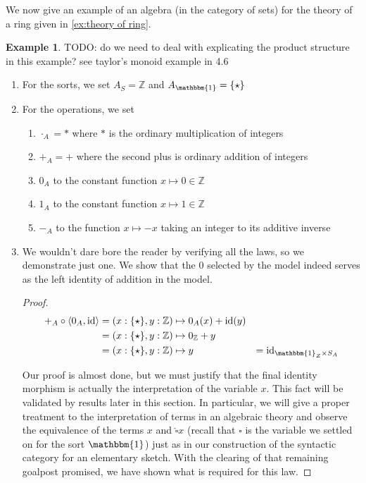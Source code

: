 \documentclass[12pt,twoside]{reedthesis}
\theoremstyle{definition}
\newtheorem{example}{Example}
\theoremstyle{remark}
\theoremstyle{plain}
\begin{document}
We now give an example of an algebra (in the category of sets) for the theory of
a ring given in \ref{ex:theory of ring}.
\begin{example}\label{ex:integer ring}
  TODO: do we need to deal with explicating the product structure in this
  example? see taylor's monoid example in 4.6
  \begin{enumerate}
    \item For the sorts, we set $A_{S} = \mathbb{Z}$ and $A_{\mathbbm{1}} = \{\star\}$
    \item For the operations, we set
    \begin{enumerate}
      \item $\cdot_A = *$ where $*$ is the ordinary multiplication of integers
      \item $+_{A} = +$ where the second plus is ordinary addition of integers
      \item $0_{A}$ to the constant function $x \mapsto 0 \in \mathbb{Z}$
      \item $1_{A}$ to the constant function $x \mapsto 1 \in \mathbb{Z}$
      \item $-_{A}$ to the function $x \mapsto -x$ taking an integer to its additive inverse
    \end{enumerate}
    \item We wouldn't dare bore the reader by verifying all the laws, so we
          demonstrate just one. We show that the $0$ selected by the model
          indeed serves as the left identity of addition in the model.
          \begin{proof}
            \begin{align*}
              +_{A} \circ \braket{0_{A}, \id} &= (x : \{ \star \}, y : \mathbb{Z}) \mapsto 0_{A}(x) + \id(y)\\
                                          &= (x : \{ \star \}, y : \mathbb{Z}) \mapsto 0_{\mathbb{Z}} + y \\
                                          &= (x : \{ \star \}, y : \mathbb{Z}) \mapsto y
                                          &= \id_{\mathbbm{1}_{Z} \times S_{A}} \\
            \end{align*}

            Our proof is almost done, but we must justify that the final
            identity morphism is actually the interpretation of the variable
            $x$. This fact will be validated by results later in this section.
            In particular, we will give a proper treatment to the interpretation
            of terms in an algebraic theory and observe the equivalence of the
            terms $x$ and $\hat{\square} x$ (recall that $\square$ is the variable we
            settled on for the sort $\mathbbm{1}$) just as in our construction
            of the syntactic category for an elementary sketch. With the
            clearing of that remaining goalpost promised, we have shown what is
            required for this law.
          \end{proof}
  \end{enumerate}
\end{example}
\end{document}
